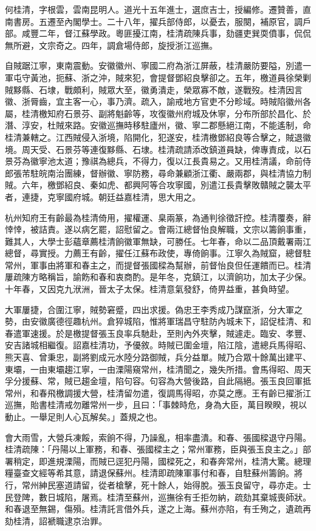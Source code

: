 \begin{pinyinscope}
何桂清，字根雲，雲南昆明人。道光十五年進士，選庶吉士，授編修。遷贊善，直南書房。五遷至內閣學士。二十八年，擢兵部侍郎，以憂去，服闋，補原官，調戶部。咸豐二年，督江蘇學政。粵匪擾江南，桂清疏陳兵事，劾疆吏巽耎僨事，侃侃無所避，文宗奇之。四年，調倉場侍郎，旋授浙江巡撫。

自賊踞江寧，東南震動。安徽徽州、寧國二府為浙江屏蔽，桂清嚴防要隘，別遣一軍屯守黃池，扼蘇、浙之沖，賊來犯，會提督鄧紹良擊卻之。五年，檄道員徐榮剿賊黟縣、石埭，戰頗利，賊眾大至，徽勇潰走，榮眾寡不敵，遂戰歿。桂清因言徽、浙脣齒，宜主客一心，事乃濟。疏入，諭戒地方官吏不分畛域。時賊陷徽州各屬，桂清檄知府石景芬、副將魁齡等，攻復徽州府城及休寧，分布所部於昌化、於潛、淳安，杜賊來路。安徽巡撫時移駐廬州，徽、寧二郡懸絕江南，不能遙制，命桂清兼轄之。江西賊侵入浙境，陷開化，犯遂安，桂清檄鄧紹良等合擊之，賊退徽境。周天受、石景芬等連復黟縣、石埭。桂清疏請添改鎮道員缺，俾專責成，以石景芬為徽寧池太道；豫祺為總兵，不得力，復以江長貴易之。又用桂清議，命前侍郎張芾駐皖南治團練，督辦徽、寧防務，尋命兼顧浙江衢、嚴兩郡，與桂清協力制賊。六年，檄鄧紹良、秦如虎、都興阿等合攻寧國，別遣江長貴擊敗贛賊之襲太平者，連捷，克寧國府城。朝廷益嘉桂清，思大用之。

杭州知府王有齡最為桂清倚用，擢權運、臬兩篆，為通判徐徵訐控。桂清覆奏，辭悻悻，被詰責。遂以病乞罷，詔慰留之。會兩江總督怡良解職，文宗以籌餉事重，難其人，大學士彭蘊章薦桂清餉徽軍無缺，可勝任。七年春，命以二品頂戴署兩江總督，尋實授。力薦王有齡，擢任江蘇布政使，專倚餉事。江寧久為賊窟，總督駐常州，軍事由將軍和春主之，而提督張國樑為幫辦，前督怡良但任運饋而已。桂清屢疏陳方略稱旨，諭飭和春和衷商酌。是年冬，克鎮江，以濟餉功，加太子少保。十年春，又因克九洑洲，晉太子太保。桂清意氣發舒，倚畀益重，甚負時望。

大軍屢捷，合圍江寧，賊勢窘蹙，四出求援。偽忠王李秀成乃謀竄浙，分大軍之勢，由安徽廣德徑趣杭州。倉猝城陷，惟將軍瑞昌守駐防內城未下，詔促桂清、和春遣軍速援。於是檄提督張玉良率兵馳赴，至則內外夾擊，賊遽走。臨安、孝豐、安吉諸城相繼復。詔嘉桂清功，予優敘。時賊已圍金壇，陷江陰，遣總兵馬得昭、熊天喜、曾秉忠，副將劉成元水陸分路御賊，兵分益單。賊乃合眾十餘萬出建平、東壩，一由東壩趨江寧，一由溧陽窺常州，桂清聞之，幾失所措。會馬得昭、周天孚分援蘇、常，賊已趨金壇，陷句容。句容為大營後路，自此隔絕。張玉良回軍抵常州，和春飛檄調援大營，桂清留勿遣，復調馬得昭，亦莫之應。王有齡已擢浙江巡撫，貽書桂清戒勿離常州一步，且曰：「事棘時危，身為大臣，萬目睽睽，視以動止。一舉足則人心瓦解矣。」蓋規之也。

會大雨雪，大營兵凍餒，索餉不得，乃譟亂，相率盡潰。和春、張國樑退守丹陽。桂清疏陳：「丹陽以上軍務，和春、張國樑主之；常州軍務，臣與張玉良主之。」部署稍定，即進規溧陽，而賊已逕犯丹陽，國樑死之，和春奔常州，桂清大驚。總理糧臺查文經等希其意，請退保蘇州。桂清即疏陳軍事付和春，自駐蘇州籌餉。將行，常州紳民塞道請留，從者槍擊，死十餘人，始得脫。張玉良留守，尋亦走。士民登陴，數日城陷，屠焉。桂清至蘇州，巡撫徐有壬拒勿納，疏劾其棄城喪師狀。和春退至無錫，傷殞。桂清託言借外兵，遂之上海。蘇州亦陷，有壬殉之，遺疏再劾桂清，詔褫職逮京治罪。


\end{pinyinscope}
